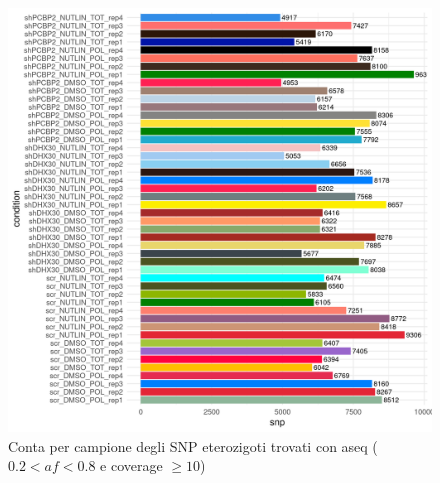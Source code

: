  \begin{figure}[H]
   \centering
   \includegraphics[scale=1]{aseq_count_2_8_10_pre.png}
	 \caption{Conta per campione degli SNP eterozigoti trovati con aseq ($0.2< af < 0.8$ e coverage $\ge 10$)}
   \label{fig:}
 \end{figure}

